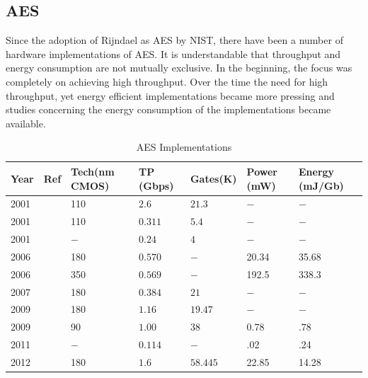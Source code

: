 \documentclass[12pt]{llncs}
\begin{document}
\subsection{AES}
\label{sec:aes}
Since the adoption of Rijndael as AES by NIST, there have been a number of hardware implementations of AES. It is understandable that throughput and energy consumption are not mutually exclusive. In the beginning, the focus was completely on achieving high throughput. Over the time the need for high throughput, yet energy efficient implementations became more pressing and studies concerning the energy consumption of the implementations became available.
\begin{table}
\begin{center}
\begin{tabular}{|p{}
				|p{}
				|p{}
				|p{}
				|p{}
				|p{}
				|p{}|
				}
\hline
Year & Ref & Tech(nm CMOS)& TP (Gbps) & Gates(K) & Power (mW) & Energy (mJ/Gb) \\
\hline
2001 & \cite{IBM_Japan_2001} & 110 & $2.6$ &$21.3$  & $-$ & $-$ \\ \hline
2001 & \cite{IBM_Japan_2001} & 110 & $0.311$ &$5.4$  & $-$ & $-$ \\ \hline
2001 & \cite{IBM_India_IIT_2001} & $-$ & $0.24$ &$4$  & $-$ & $-$ \\ \hline
2006 & \cite{Taiwan_2006} & 180 & $0.570$ & $-$ &20.34 & 35.68 \\ \hline
2006 & \cite{Taiwan_2006} & 350 & $0.569$ & $-$ &192.5 & 338.3 \\ \hline
2007 & \cite{IIT_Kharagpur_2007} & 180 & $0.384$ &$21$ & $-$  & $-$ \\ \hline
2009 & \cite{IME_China_Tsinghua_Univerisity_2009} & 180 & $1.16$ &$19.47$ & $-$ & $-$ \\ \hline
2009 & \cite{Ruhr_2009} &90&$ 1.00$ &$38$ &0.78 & $ .78$ \\ \hline
2011 & \cite{Ruhr_2011} & $-$ & $0.114$ &$ - $ &.02 & .24 \\ \hline
2012 & \cite{Pune_2012} & 180 & $1.6$ &$58.445$ &22.85 & 14.28 \\ \hline
\end{tabular}
\end{center}
\caption{AES Implementations}
\label{table:aes_implementation}
\end{table}
\end{document}
